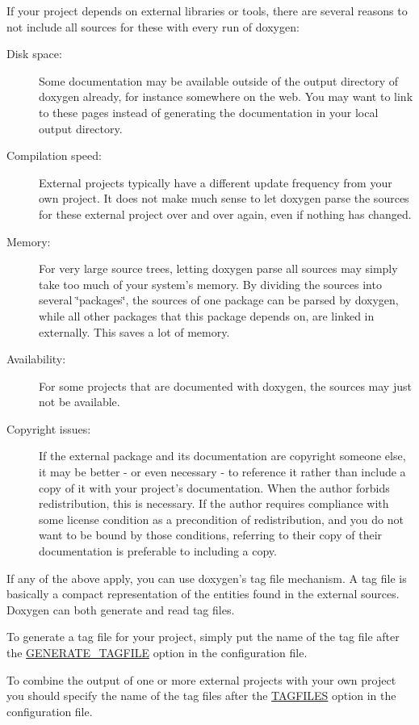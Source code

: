 If your project depends on external libraries or tools, there are several reasons to not include all sources for these with every run of doxygen:

\begin{description}
\item[Disk space:]Some documentation may be available outside of the output directory of doxygen already, for instance somewhere on the web. You may want to link to these pages instead of generating the documentation in your local output directory. \item[Compilation speed:]External projects typically have a different update frequency from your own project. It does not make much sense to let doxygen parse the sources for these external project over and over again, even if nothing has changed. \item[Memory:]For very large source trees, letting doxygen parse all sources may simply take too much of your system's memory. By dividing the sources into several \char`\"{}packages\char`\"{}, the sources of one package can be parsed by doxygen, while all other packages that this package depends on, are linked in externally. This saves a lot of memory. \item[Availability:]For some projects that are documented with doxygen, the sources may just not be available. \item[Copyright issues:]If the external package and its documentation are copyright someone else, it may be better - or even necessary - to reference it rather than include a copy of it with your project's documentation. When the author forbids redistribution, this is necessary. If the author requires compliance with some license condition as a precondition of redistribution, and you do not want to be bound by those conditions, referring to their copy of their documentation is preferable to including a copy.

\end{description}


If any of the above apply, you can use doxygen's tag file mechanism. A tag file is basically a compact representation of the entities found in the external sources. Doxygen can both generate and read tag files.

To generate a tag file for your project, simply put the name of the tag file after the \hyperlink{config_cfg_generate_tagfile}{GENERATE\_\-TAGFILE} option in the configuration file.

To combine the output of one or more external projects with your own project you should specify the name of the tag files after the \hyperlink{config_cfg_tagfiles}{TAGFILES} option in the configuration file.

